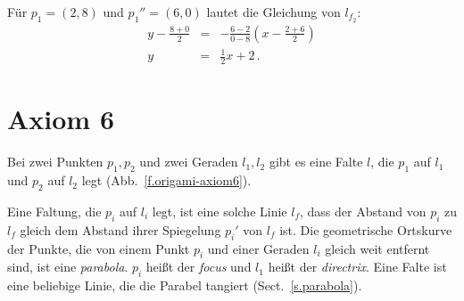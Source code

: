 \begin{example}
Für $p_1=(2,8)$ und $p_1''=(6,0)$ lautet die Gleichung von $l_{f_2}$:
\begin{eqnarray*}
y-\frac{8+0}{2}&=&-\frac{6-2}{0-8}\left(x-\frac{2+6}{2}\right)\\
y&=&\frac{1}{2}x+2\,.
\end{eqnarray*}
\end{example}


\section{Axiom 6}\label{s.ax6}

\begin{axiom}
Bei zwei Punkten $p_1,p_2$ und zwei Geraden $l_1,l_2$ gibt es eine Falte $l$, die $p_1$ auf $l_1$ und $p_2$ auf $l_2$ legt (Abb.~\ref{f.origami-axiom6}).
\end{axiom}

Eine Faltung, die $p_i$ auf $l_i$ legt, ist eine solche Linie $l_f$, dass der Abstand von $p_i$ zu $l_f$ gleich dem Abstand ihrer Spiegelung $p_i'$ von $l_f$ ist. Die geometrische Ortskurve der Punkte, die von einem Punkt $p_i$ und einer Geraden $l_i$ gleich weit entfernt sind, ist eine \emph{parabola}. $p_i$ heißt der \emph{focus} und $l_1$ heißt der \emph{directrix}. Eine Falte ist eine beliebige Linie, die die Parabel tangiert (Sect.~\ref{s.parabola}).

